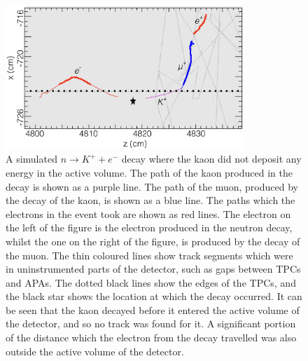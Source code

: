 \begin{figure}
  \centering
  \includegraphics[width=0.8\textwidth]{MissedKaon}
  \caption[A simulated $n \rightarrow K^{+} + e^{-}$ decay where the kaon did not deposit any energy in the active volume]
          {A simulated $n \rightarrow K^{+} + e^{-}$ decay where the kaon did not deposit any energy in the active volume. The path of the kaon produced in the decay is shown as a purple line. The path of the muon, produced by the decay of the kaon, is shown as a blue line. The paths which the electrons in the event took are shown as red lines. The electron on the left of the figure is the electron produced in the neutron decay, whilst the one on the right of the figure, is produced by the decay of the muon. The thin coloured lines show track segments which were in uninstrumented parts of the detector, such as gaps between TPCs and APAs. The dotted black lines show the edges of the TPCs, and the black star shows the location at which the decay occurred. It can be seen that the kaon decayed before it entered the active volume of the detector, and so no track was found for it. A significant portion of the distance which the electron from the decay travelled was also outside the active volume of the detector.}
  \label{fig:NDK_Sig_MissedKaon}
\end{figure}

